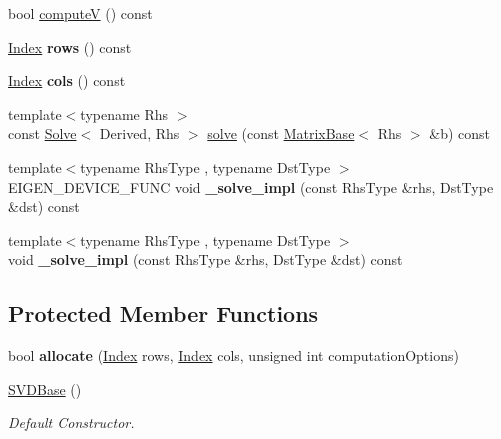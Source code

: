 \begin{DoxyCompactItemize}
\item 
bool \mbox{\hyperlink{class_eigen_1_1_s_v_d_base_a5f12efcb791eb007d4a4890ac5255ac4}{computeV}} () const
\item 
\mbox{\label{class_eigen_1_1_s_v_d_base_ab1a0d1fcc818a876c3cb2b32887604be}} 
\mbox{\hyperlink{class_eigen_1_1_s_v_d_base_a6229a37997eca1072b52cca5ee7a2bec}{Index}} {\bfseries rows} () const
\item 
\mbox{\label{class_eigen_1_1_s_v_d_base_a083d99e05949bab974bbff2966606b7f}} 
\mbox{\hyperlink{class_eigen_1_1_s_v_d_base_a6229a37997eca1072b52cca5ee7a2bec}{Index}} {\bfseries cols} () const
\item 
{\footnotesize template$<$typename Rhs $>$ }\\const \mbox{\hyperlink{class_eigen_1_1_solve}{Solve}}$<$ Derived, Rhs $>$ \mbox{\hyperlink{class_eigen_1_1_s_v_d_base_ab28499936c0764fe5b56b9f4de701e26}{solve}} (const \mbox{\hyperlink{class_eigen_1_1_matrix_base}{Matrix\+Base}}$<$ Rhs $>$ \&b) const
\item 
\mbox{\label{class_eigen_1_1_s_v_d_base_abf33b0dd55b31392ef321d491bf4fc27}} 
{\footnotesize template$<$typename Rhs\+Type , typename Dst\+Type $>$ }\\E\+I\+G\+E\+N\+\_\+\+D\+E\+V\+I\+C\+E\+\_\+\+F\+U\+NC void {\bfseries \+\_\+solve\+\_\+impl} (const Rhs\+Type \&rhs, Dst\+Type \&dst) const
\item 
\mbox{\label{class_eigen_1_1_s_v_d_base_ac3cd36e54727b6ae24e71b67d7e290dc}} 
{\footnotesize template$<$typename Rhs\+Type , typename Dst\+Type $>$ }\\void {\bfseries \+\_\+solve\+\_\+impl} (const Rhs\+Type \&rhs, Dst\+Type \&dst) const
\end{DoxyCompactItemize}
\subsection*{Protected Member Functions}
\begin{DoxyCompactItemize}
\item 
\mbox{\label{class_eigen_1_1_s_v_d_base_a7be177a4c6e8e3fbf2bec40cb527321c}} 
bool {\bfseries allocate} (\mbox{\hyperlink{class_eigen_1_1_s_v_d_base_a6229a37997eca1072b52cca5ee7a2bec}{Index}} rows, \mbox{\hyperlink{class_eigen_1_1_s_v_d_base_a6229a37997eca1072b52cca5ee7a2bec}{Index}} cols, unsigned int computation\+Options)
\item 
\mbox{\hyperlink{class_eigen_1_1_s_v_d_base_abed06fc6f4b743e1f76a7b317539da87}{S\+V\+D\+Base}} ()
\begin{DoxyCompactList}\small\item\em Default Constructor. \end{DoxyCompactList}\end{DoxyCompactItemize}
